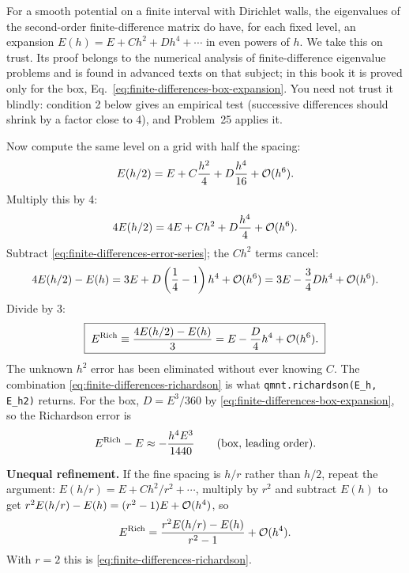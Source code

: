 \begin{beyond}
For a smooth potential on a finite interval with Dirichlet walls, the eigenvalues of the second-order finite-difference matrix do have, for each fixed level, an expansion $E(h)=E+Ch^2+Dh^4+\cdots$ in even powers of $h$. We take this on trust. Its proof belongs to the numerical analysis of finite-difference eigenvalue problems and is found in advanced texts on that subject; in this book it is proved only for the box, Eq.~\eqref{eq:finite-differences-box-expansion}. You need not trust it blindly: condition 2 below gives an empirical test (successive differences should shrink by a factor close to 4), and Problem~25 applies it.
\end{beyond} Now compute the same level on a grid with half the spacing:
\begin{equation*}
E(h/2)=E+C\frac{h^2}{4}+D\frac{h^4}{16}+\mathcal{O}(h^6).
\end{equation*}
Multiply this by 4:
\begin{equation*}
4E(h/2)=4E+Ch^2+D\frac{h^4}{4}+\mathcal{O}(h^6).
\end{equation*}
Subtract \eqref{eq:finite-differences-error-series}; the $Ch^2$ terms cancel:
\begin{equation*}
4E(h/2)-E(h)=3E+D\left(\frac14-1\right)h^4+\mathcal{O}(h^6)=3E-\frac34Dh^4+\mathcal{O}(h^6).
\end{equation*}
Divide by 3:
\begin{equation}
\boxed{\;E^{\rm Rich}\equiv\frac{4E(h/2)-E(h)}{3}=E-\frac{D}{4}h^4+\mathcal{O}(h^6).\;}
\label{eq:finite-differences-richardson}
\end{equation}
The unknown $h^2$ error has been eliminated without ever knowing $C$. The combination \eqref{eq:finite-differences-richardson} is what \texttt{qmnt.richardson(E\_h, E\_h2)} returns. For the box, $D=E^3/360$ by \eqref{eq:finite-differences-box-expansion}, so the Richardson error is
\begin{equation}
E^{\rm Rich}-E\approx-\frac{h^4E^3}{1440}\qquad\text{(box, leading order)}.
\label{eq:finite-differences-rich-box}
\end{equation}

\textbf{Unequal refinement.} If the fine spacing is $h/r$ rather than $h/2$, repeat the argument: $E(h/r)=E+Ch^2/r^2+\cdots$, multiply by $r^2$ and subtract $E(h)$ to get $r^2E(h/r)-E(h)=(r^2-1)E+\mathcal{O}(h^4)$, so
\begin{equation}
E^{\rm Rich}=\frac{r^2E(h/r)-E(h)}{r^2-1}+\mathcal{O}(h^4).
\label{eq:finite-differences-richardson-r}
\end{equation}
With $r=2$ this is \eqref{eq:finite-differences-richardson}.

